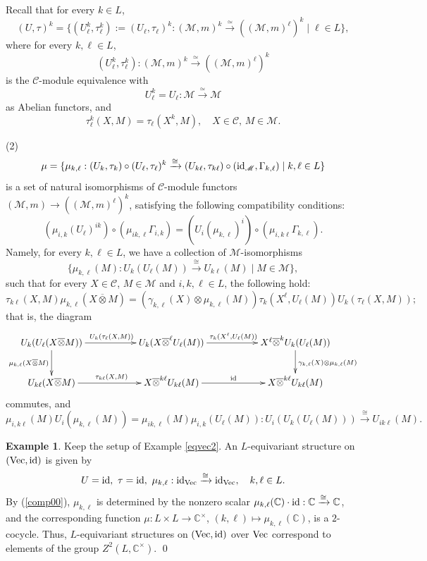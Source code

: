 \documentclass{amsart}
\theoremstyle{definition}
\newtheorem{example}[theorem]{Example}
\newcommand{\id}{{\rm id}}
\newcommand{\Vect}{{\rm Vec}}
\newcommand{\C}{\mathscr{C}}
\newcommand{\M}{\mathscr{M}}
\newcommand{\ot}{\otimes}
\numberwithin{equation}{section}
\begin{document}
Recall that for every $k\in L$, 
$$(U,\tau)^k=\{(U_{\ell}^k,\tau_{\ell}^k):=(U_{\ell},\tau_{\ell})^k:
(\M,m)^k\xrightarrow{\simeq}((\M,m)^{\ell})^k \mid \ell\in L\},$$
where for every $k,\ell\in L$,
$$(U_{\ell}^k,\tau_{\ell}^k):(\M,m)^k\xrightarrow{\simeq}
((\M,m)^{\ell})^k$$
is the $\C$-module equivalence with
$$U_{\ell}^k=U_{\ell}:\M\xrightarrow{\simeq} \M$$
as Abelian functors, and 
$$\tau_{\ell}^k(X,M)=\tau_{\ell}(X^k,M),\quad X\in\C,\,M\in\M.$$

(2) 
\begin{equation}\label{mufirst}
\mu=\{\mu_{k,\ell}:(U_{k},\tau_{k})\circ(U_{\ell},\tau_{\ell})^k \xrightarrow{\cong} (U_{k\ell},\tau_{k\ell})\circ(\id_{\M},\Gamma_{k,\ell})\mid k,\ell\in L\}
\end{equation} 
is a set of natural isomorphisms of $\C$-module functors $(\M,m)\to((\M,m)^{\ell})^k$, satisfying the following compatibility conditions:
$$(\mu_{i,k}(U_{\ell})^{ik})\circ (\mu_{ik,{\ell}}\Gamma_{i,k})=(U_i(\mu_{k,{\ell}})^i)\circ (\mu_{i,k{\ell}}\Gamma_{k,{\ell}}).$$
Namely, 
for every $k,\ell\in L$, we have a collection of $\M$-isomorphisms 
$$\{\mu_{k,\ell}(M): U_k(U_{\ell}(M))\xrightarrow{\cong}U_{k\ell}(M)\mid M\in \M\},$$
such that for every $X\in \C$, $M\in \M$ and $i,k,\ell\in L$, the following hold: 
\begin{equation}\label{munat0}
\tau_{k\ell}(X,M)\mu_{k,\ell}(X\overline{\ot} M)= (\gamma_{k,\ell}(X)\ot \mu_{k,\ell}(M))\tau_{k}(X^\ell,U_{\ell}\left(M\right))U_{k}(\tau_{\ell}(X,M));
\end{equation}
that is, the diagram
\begin{equation*}
\xymatrixcolsep{4.5pc}\xymatrix{
U_k(U_{\ell}(X\overline{\ot}M)) \ar[d]_{\mu_{k,\ell}(X\overline{\ot} M)} \ar[r]^{U_{k}(\tau_{\ell}(X,M))} 
& U_{k}(X\overline{\ot}^\ell U_{\ell}(M)) \ar[r]^{\tau_{k}(X^\ell,U_{\ell}\left(M\right))}
& X^{\ell}\overline{\ot}^{k} U_{k}(U_{\ell}(M)) \ar[d]^{\gamma_{k,\ell}(X)\ot \mu_{k,\ell}(M)}\\
U_{k\ell}(X\overline{\ot}M) \ar[r]^{\tau_{k\ell}(X,M)} 
& X\overline{\ot}^{k\ell} U_{k\ell}(M) \ar[r]^{\id} 
& X\overline{\ot}^{k\ell}U_{k\ell}(M)
}
\end{equation*}
commutes, and 
\begin{equation}\label{comp00}
\mu_{i,k\ell}(M)U_i(\mu_{k,\ell}(M))=
\mu_{ik,\ell}(M)\mu_{i,k}(U_{\ell}(M)): U_{i}(U_k(U_{\ell}(M)))\xrightarrow{\cong}U_{ik\ell}(M).
\end{equation}

\begin{example}\label{eqvec3}
Keep the setup of Example \ref{eqvec2}. An $L$-equivariant structure on $(\Vect,\id)$ is given by 
$$U=\id,\,\,\tau=\id,\,\,\mu_{k,\ell}:\id_{\Vect}\xrightarrow{\cong} \id_{\Vect},\quad k,\ell\in L.$$ By (\ref{comp00}), $\mu_{k,\ell}$ is determined by the nonzero scalar $\mu_{k,\ell}(\mathbb{C})\cdot {\rm id}:\mathbb{C}\xrightarrow{\cong} \mathbb{C}$, and the corresponding function $\mu:L\times L\to\mathbb{C}^{\times}$, $(k,\ell)\mapsto \mu_{k,\ell}(\mathbb{C})$, is a $2$-cocycle. Thus, $L$-equivariant structures on $(\Vect,\id)$ over $\Vect$ correspond to elements of the group $Z^2(L,\mathbb{C}^{\times})$. \qed
\end{example}
\end{document}
